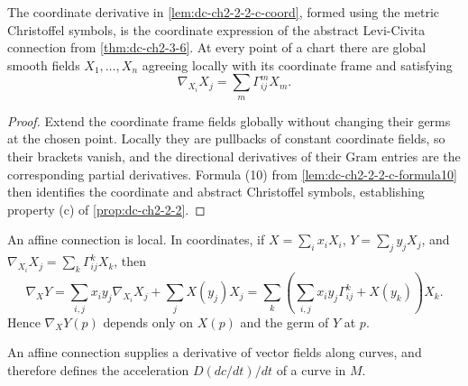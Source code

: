 \begin{lemma}
  \label{lem:dc-ch2-2-2-c-bridge}


  The coordinate derivative in \cref{lem:dc-ch2-2-2-c-coord}, formed using the
  metric Christoffel symbols, is the coordinate expression of the abstract
  Levi-Civita connection from \cref{thm:dc-ch2-3-6}. At every point of a chart
  there are global smooth fields $X_1,\dots,X_n$ agreeing locally with its
  coordinate frame and satisfying
  \[
    \nabla_{X_i}X_j=\sum_m\Gamma^m_{ij}X_m.
  \]
  \end{lemma}
\begin{proof}

    \sketch
    Extend the coordinate frame fields globally without changing their germs at
    the chosen point. Locally they are pullbacks of constant coordinate fields,
    so their brackets vanish, and the directional derivatives of their Gram
    entries are the corresponding partial derivatives. Formula (10) from
    \cref{lem:dc-ch2-2-2-c-formula10} then identifies the coordinate and abstract
    Christoffel symbols, establishing property (c) of
    \cref{prop:dc-ch2-2-2}.
  \end{proof}

\begin{remark}[Remark 2.3]
  \label{rem:dc-ch2-2-3}


  An affine connection is local. In coordinates, if
  $X=\sum_ix_iX_i$, $Y=\sum_jy_jX_j$, and
  $\nabla_{X_i}X_j=\sum_k\Gamma_{ij}^kX_k$, then
  \[
    \nabla_XY
      =\sum_{i,j}x_iy_j\nabla_{X_i}X_j+\sum_jX(y_j)X_j
      =\sum_k\left(\sum_{i,j}x_iy_j\Gamma_{ij}^k+X(y_k)\right)X_k.
  \]
  Hence $\nabla_XY(p)$ depends only on $X(p)$ and the germ of $Y$ at $p$.
\end{remark}

\begin{remark}[Remark 2.4]
  \label{rem:dc-ch2-2-4}


  An affine connection supplies a derivative of vector fields along curves, and
  therefore defines the acceleration $D(dc/dt)/dt$ of a curve in $M$.
\end{remark}

